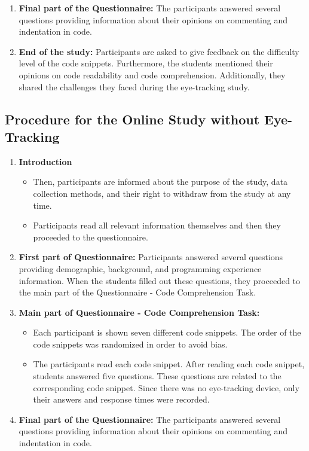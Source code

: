 \begin{enumerate}
    \item \textbf{Final part of the Questionnaire:} 
    The participants answered several questions providing information about their opinions on commenting and indentation in code.

    \item \textbf{End of the study:} 
    Participants are asked to give feedback on the difficulty level of the code snippets. Furthermore, the students mentioned their opinions on code readability and code comprehension. Additionally, they shared the challenges they faced during the eye-tracking study.

\end{enumerate}


\subsection{Procedure for the Online Study without Eye-Tracking}


\begin{enumerate}
    \item \textbf{Introduction}
    \begin{itemize}
        \item Then, participants are informed about the purpose of the study, data collection methods, and their right to withdraw from the study at any time.
        \item Participants read all relevant information themselves and then they proceeded to the questionnaire.
    \end{itemize}
    
    \item \textbf{First part of Questionnaire:}
    Participants answered several questions providing demographic, background, and programming experience information. When the students filled out these questions, they proceeded to the main part of the Questionnaire - Code Comprehension Task.

    \item \textbf{Main part of Questionnaire - Code Comprehension Task:}
    \begin{itemize}
        \item Each participant is shown seven different code snippets. The order of the code snippets was randomized in order to avoid bias.
        \item The participants read each code snippet. After reading each code snippet, students answered five questions. These questions are related to the corresponding code snippet. Since there was no eye-tracking device, only their answers and response times were recorded.
    \end{itemize}

    \item \textbf{Final part of the Questionnaire:}
    The participants answered several questions providing information about their opinions on commenting and indentation in code.
\end{enumerate}







